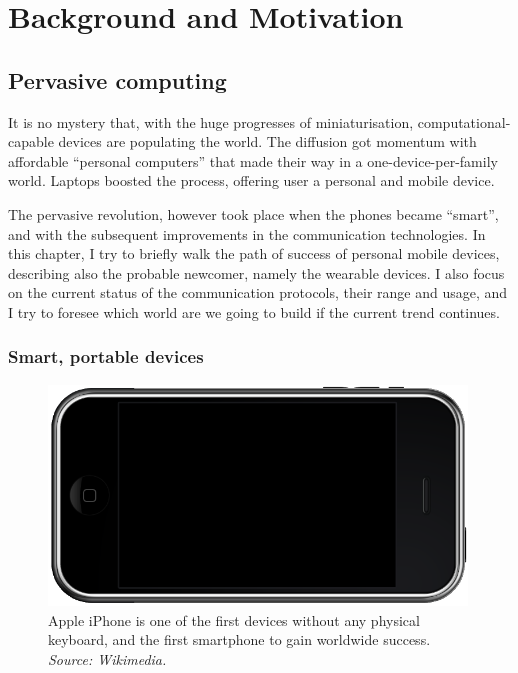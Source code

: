 \documentclass[12pt,a4paper,twoside,openright]{book}
\begin{document}
\mainmatter

\pagestyle{fancy}
\fancyhead[LE,RO]{\bfseries\thepage}

\part{Background and Motivation}
\label{background}
\chapter{Pervasive computing}
\label{pervasive-devices}

It is no mystery that, with the huge progresses of miniaturisation, computational-capable devices are populating the world.
%
The diffusion got momentum with affordable ``personal computers'' that made their way in a one-device-per-family world.
%
Laptops boosted the process, offering user a personal and mobile device.

The pervasive revolution, however took place when the phones became ``smart'', and with the subsequent improvements in the communication technologies.
%
In this chapter, I try to briefly walk the path of success of personal mobile devices, describing also the probable newcomer, namely the wearable devices.
%
I also focus on the current status of the communication protocols, their range and usage, and I try to foresee which world are we going to build if the current trend continues.

\section{Smart, portable devices}

\begin{figure}
	\centering
	\includegraphics[width=0.99\textwidth]{img/iphone}
	\caption[Apple iPhone]{Apple iPhone is one of the first devices without any physical keyboard, and the first smartphone to gain worldwide success. \emph{Source: Wikimedia.}}
	\label{img:iphone}
\end{figure}
\end{document}
